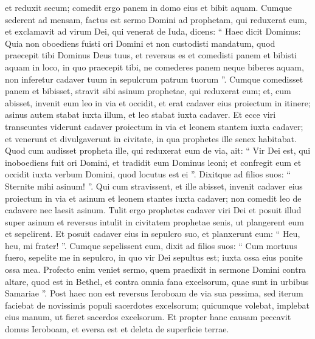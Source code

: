 \begin{biblechapter}
\begin{biblechapter}
\begin{biblechapter}
\begin{biblechapter}
\begin{biblechapter}
\begin{biblechapter}
\begin{biblechapter}
\begin{biblechapter}
\begin{biblechapter}
\begin{biblechapter}
\begin{biblechapter}
\begin{biblechapter}
\begin{biblechapter}
\verse et reduxit secum; comedit ergo panem in domo eius et bibit aquam.
 \verse Cumque sederent ad mensam, factus est sermo Domini ad prophetam, qui reduxerat eum, 
\verse et exclamavit ad virum Dei, qui venerat de Iuda, dicens: “ Haec dicit Dominus: Quia non oboediens fuisti ori Domini et non custodisti mandatum, quod praecepit tibi Dominus Deus tuus, 
\verse et reversus es et comedisti panem et bibisti aquam in loco, in quo praecepit tibi, ne comederes panem neque biberes aquam, non inferetur cadaver tuum in sepulcrum patrum tuorum ”.
 \verse Cumque comedisset panem et bibisset, stravit sibi asinum prophetae, qui reduxerat eum; 
\verse et, cum abisset, invenit eum leo in via et occidit, et erat cadaver eius proiectum in itinere; asinus autem stabat iuxta illum, et leo stabat iuxta cadaver. 
\verse Et ecce viri transeuntes viderunt cadaver proiectum in via et leonem stantem iuxta cadaver; et venerunt et divulgaverunt in civitate, in qua prophetes ille senex habitabat. 
\verse Quod cum audisset propheta ille, qui reduxerat eum de via, ait: “ Vir Dei est, qui inoboediens fuit ori Domini, et tradidit eum Dominus leoni; et confregit eum et occidit iuxta verbum Domini, quod locutus est ei ”. 
\verse Dixitque ad filios suos: “ Sternite mihi asinum! ”. Qui cum stravissent, 
\verse et ille abisset, invenit cadaver eius proiectum in via et asinum et leonem stantes iuxta cadaver; non comedit leo de cadavere nec laesit asinum.
 \verse Tulit ergo prophetes cadaver viri Dei et posuit illud super asinum et reversus intulit in civitatem prophetae senis, ut plangerent eum et sepelirent. 
\verse Et posuit cadaver eius in sepulcro suo, et planxerunt eum: “ Heu, heu, mi frater! ”. 
\verse Cumque sepelissent eum, dixit ad filios suos: “ Cum mortuus fuero, sepelite me in sepulcro, in quo vir Dei sepultus est; iuxta ossa eius ponite ossa mea. 
\verse Profecto enim veniet sermo, quem praedixit in sermone Domini contra altare, quod est in Bethel, et contra omnia fana excelsorum, quae sunt in urbibus Samariae ”.
 \verse Post haec non est reversus Ieroboam de via sua pessima, sed iterum faciebat de novissimis populi sacerdotes excelsorum; quicumque volebat, implebat eius manum, ut fieret sacerdos excelsorum. 
\verse Et propter hanc causam peccavit domus Ieroboam, et eversa est et deleta de superficie terrae.
 

\end{biblechapter}
\end{biblechapter}
\end{biblechapter}
\end{biblechapter}
\end{biblechapter}
\end{biblechapter}
\end{biblechapter}
\end{biblechapter}
\end{biblechapter}
\end{biblechapter}
\end{biblechapter}
\end{biblechapter}
\end{biblechapter}
